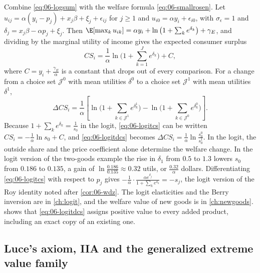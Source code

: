 Combine \eqref{eq:06-logsum} with the welfare formula \eqref{eq:06-smallrosen}. Let
$u_{ij} = \alpha(y_i - p_j) + x_j\beta + \xi_j + \epsilon_{ij}$ for $j \ge 1$ and $u_{i0} = \alpha y_i + \epsilon_{i0}$,
with $\sigma_\epsilon = 1$ and $\delta_j = x_j\beta - \alpha p_j + \xi_j$. Then
$\E[\max_k u_{ik}] = \alpha y_i + \ln\big(1 + \sum_k e^{\delta_k}\big) + \gamma_E$, and dividing by the marginal utility
of income gives the expected consumer surplus
\begin{equation}\label{eq:06-logitcs}
CS_i = \frac{1}{\alpha}\ln\Big(1 + \sum_{k=1}^J e^{\delta_k}\Big) + C ,
\end{equation}
where $C = y_i + \frac{\gamma_E}{\alpha}$ is a constant that drops out of every comparison. For a change from a
choice set $\mathcal{J}^0$ with mean utilities $\delta^0$ to a choice set $\mathcal{J}^1$ with mean utilities $\delta^1$,
\begin{equation}\label{eq:06-logitdcs}
\Delta CS_i = \frac{1}{\alpha}\left[\ln\Big(1 + \sum_{k\in\mathcal{J}^1}e^{\delta^1_k}\Big)
- \ln\Big(1 + \sum_{k\in\mathcal{J}^0}e^{\delta^0_k}\Big)\right].
\end{equation}
Because $1 + \sum_k e^{\delta_k} = \frac{1}{s_0}$ in the logit, \eqref{eq:06-logitcs} can be written
$CS_i = -\frac{1}{\alpha}\ln s_0 + C$, and \eqref{eq:06-logitdcs} becomes
$\Delta CS_i = \frac{1}{\alpha}\ln\frac{s_0^0}{s_0^1}$. In the logit, the outside share and the price coefficient
alone determine the welfare change. In the logit version of the two-goods example the rise in $\delta_1$ from $0.5$ to $1.3$
lowers $s_0$ from $0.186$ to $0.135$, a gain of $\ln\frac{0.186}{0.135} \approx 0.32$ utils, or
$\frac{0.32}{\alpha}$ dollars. Differentiating \eqref{eq:06-logitcs} with respect to $p_j$ gives
$-\frac{1}{\alpha}\cdot\frac{\alpha e^{\delta_j}}{1 + \sum_k e^{\delta_k}} = -s_j$, the logit version of the Roy
identity noted after \cref{cor:06-wdz}. The logit elasticities and the Berry inversion are in \cref{ch:logit},
and the welfare value of new goods is in \cref{ch:newgoods}.  shows that
\eqref{eq:06-logitdcs} assigns positive value to every added product, including an exact copy of an existing one.

\subsection{Luce's axiom, IIA and the generalized extreme value family}\label{sec:06-gev}


